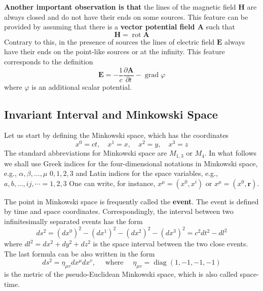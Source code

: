 \textbf{Another important observation is that} the lines of the magnetic field $\mathbf{H}$ are always closed and do not have their ends on some sources. This feature can be provided by assuming that there is a \textbf{vector potential field $\mathbf{A}$} such that
\begin{equation}
\mathbf{H}=\operatorname{rot} \mathbf{A}
\end{equation}
Contrary to this, in the presence of sources the lines of electric field $\mathbf{E}$ always have their ends on the point-like sources or at the infinity. This feature corresponds to the definition
\begin{equation}
\mathbf{E}=-\frac{1}{c} \frac{\partial \mathbf{A}}{\partial t}-\operatorname{grad} \varphi
\end{equation}
where $\varphi$ is an additional scalar potential.
\subsection{Invariant Interval and Minkowski Space}
Let us start by defining the Minkowski space, which has the coordinates
\begin{equation}
x^{0}=c t, \quad x^{1}=x, \quad x^{2}=y, \quad x^{3}=z
\end{equation}
The standard abbreviations for Minkowski space are $M_{1,3}$ or $M_4$. In what follows we shall use Greek indices for the four-dimensional notations in Minkowski space, e.g., $\alpha, \beta, \ldots, \mu$
$0,1,2,3$ and Latin indices for the space variables, e.g., $a, b, \ldots, i j, \cdots=1,2,3$ One can write, for instance, $x^{\mu}=\left(x^{0}, x^{i}\right)$ or $x^{\mu}=\left(x^{0}, \mathbf{r}\right)$.

The point in Minkowski space is frequently called the \textbf{event}. The event is defined by time and space coordinates. Correspondingly, the interval between two infinitesimally separated events has the form
\begin{equation}
d s^{2}=\left(d x^{0}\right)^{2}-\left(d x^{1}\right)^{2}-\left(d x^{2}\right)^{2}-\left(d x^{3}\right)^{2}=c^{2} d t^{2}-d l^{2}
\end{equation}
where $d l^{2}=d x^{2}+d y^{2}+d z^{2}$ is the space interval between the two close events. The last formula can be also written in the form
\begin{equation}
d s^{2}=\eta_{\mu v} d x^{\mu} d x^{v}, \quad \text { where } \quad \eta_{\mu v}=\operatorname{diag}(1,-1,-1,-1)
\end{equation}
is the metric of the $p$seudo-Euclidean Minkowski space, which is also called space-
time. 

